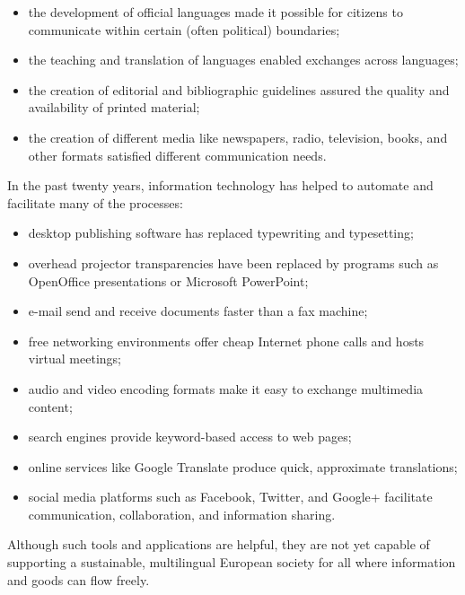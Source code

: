 \documentclass[]{../../metanetpaper}
\begin{document}
\begin{Parallel}[c]{77mm}{77mm}
{\begin{itemize}
\item the development of official languages made it possible for citizens to
communicate within certain (often political) boundaries;

\item the teaching and translation of languages enabled exchanges across languages;

\item the creation of editorial and bibliographic guidelines assured the quality and
availability of printed material;

\item the creation of different media like newspapers, radio, television, books, and
other formats satisfied different communication needs.
\end{itemize}
In the past twenty years, information technology has helped to automate and
facilitate many of the processes:
\begin{itemize}
\item desktop publishing software has replaced typewriting and typesetting;

\item overhead projector transparencies have been replaced by programs such as
OpenOffice presentations or Microsoft PowerPoint;

\item e-mail send and receive documents faster than a fax machine;

\item free networking environments offer cheap Internet phone calls and hosts virtual
meetings;

\item audio and video encoding formats make it easy to exchange multimedia content;

\item search engines provide keyword-based access to web pages;

\item online services like Google Translate produce quick, approximate translations;

\item social media platforms such as Facebook, Twitter, and Google+ facilitate
communication, collaboration, and information sharing.
\end{itemize}

Although such tools and applications are helpful, they are not yet capable of
supporting a sustainable, multilingual European society for all where
information and goods can flow freely.
}


\end{Parallel}
\end{document}
